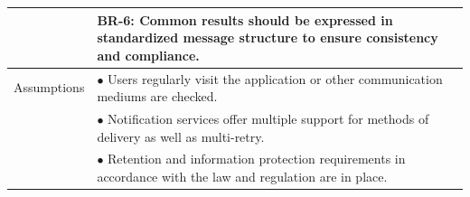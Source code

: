 \begin{longtable}{|>{\raggedright\arraybackslash}p{4cm}|>{\raggedright\arraybackslash}p{11cm}|}
& \textbf{BR-6:} Common results should be expressed in standardized message structure to ensure consistency and compliance. \\
\hline
Assumptions & $\bullet$ Users regularly visit the application or other communication mediums are checked. \\
& $\bullet$ Notification services offer multiple support for methods of delivery as well as multi-retry. \\
& $\bullet$ Retention and information protection requirements in accordance with the law and regulation are in place. \\
\hline
\end{longtable}

